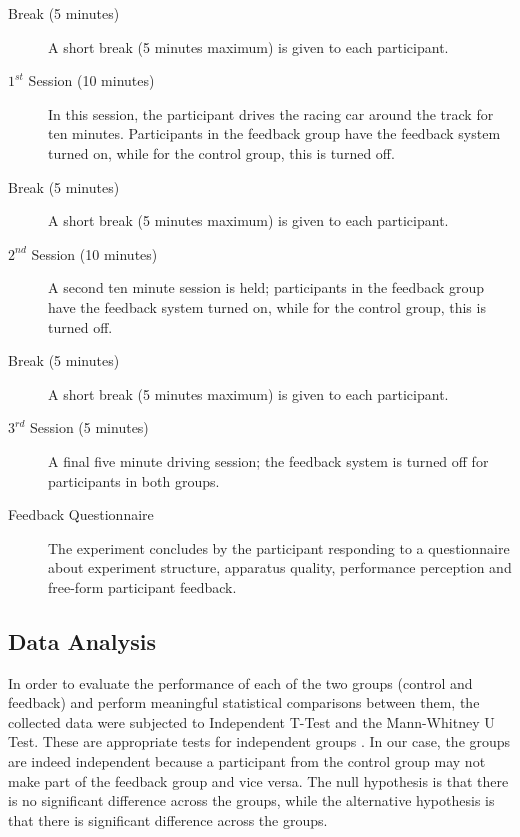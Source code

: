 \documentclass{sig-alternate}
\begin{document}
{\begin{description}
	\item[Break (5 minutes)] A short break (5 minutes maximum) is given to each participant.
	
	\item[$1^{st}$ Session (10 minutes)] In this session, the participant drives the racing car around the track for ten minutes. Participants in the feedback group have the feedback system turned on, while for the control group, this is turned off.
	
	\item[Break (5 minutes)] A short break (5 minutes maximum) is given to each participant.
	
	\item[$2^{nd}$ Session (10 minutes)] A second ten minute session is held; participants in the feedback group have the feedback system turned on, while for the control group, this is turned off.
	
	\item[Break (5 minutes)] A short break (5 minutes maximum) is given to each participant.
	
	\item[$3^{rd}$ Session (5 minutes)] A final five minute driving session; the feedback system is turned off for participants in both groups.
	
	\item[Feedback Questionnaire] The experiment concludes by the participant responding to a questionnaire about experiment structure, apparatus quality, performance perception and free-form participant feedback.
	
\end{description}

\subsection{Data Analysis}
In order to evaluate the performance of each of the two groups (control and feedback) and perform meaningful statistical comparisons between them, the collected data were subjected to Independent T-Test\cite{student1908probable} and the Mann-Whitney U Test\cite{mann1947test}. These are appropriate tests for independent groups \cite{de2015statsref}. In our case, the groups are indeed independent because a participant from the control group may not make part of the feedback group and vice versa. The null hypothesis is that there is no significant difference across the groups, while the alternative hypothesis is that there is significant difference across the groups.

}
\end{document}
